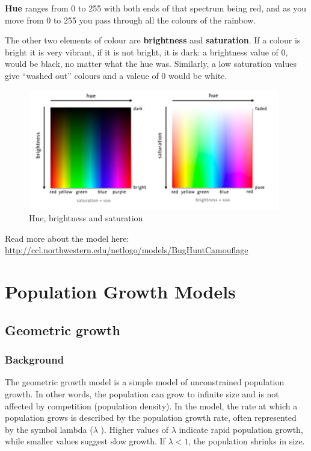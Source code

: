 \documentclass[
  a4paper]{book}
\begin{document}
\textbf{Hue} ranges from 0 to 255 with both ends of that spectrum being red, and as you move from 0 to 255 you pass through all the colours of the rainbow.

The other two elements of colour are \textbf{brightness} and \textbf{saturation}. If a colour is bright it is very vibrant, if it is not bright, it is dark: a brightness value of 0, would be black, no matter what the hue was. Similarly, a low saturation values give ``washed out'' colours and a valeue of 0 would be white.

\begin{figure}

{\centering \includegraphics[width=0.5\linewidth]{images/colours} 

}

\caption{Hue, brightness and saturation}\label{fig:colours}
\end{figure}

Read more about the model here: \url{http://ccl.northwestern.edu/netlogo/models/BugHuntCamouflage}

\part{Population Growth Models}\label{part-population-growth-models}

\chapter{Geometric growth}\label{geometric-growth}

\section{Background}\label{background-2}

The geometric growth model is a simple model of unconstrained population growth. In other words, the population can grow to infinite size and is not affected by competition (population density). In the model, the rate at which a population grows is described by the population growth rate, often represented by the symbol lambda (\(\lambda\) ). Higher values of \(\lambda\) indicate rapid population growth, while smaller values suggest slow growth. If \(\lambda < 1\), the population shrinks in size.
\end{document}
